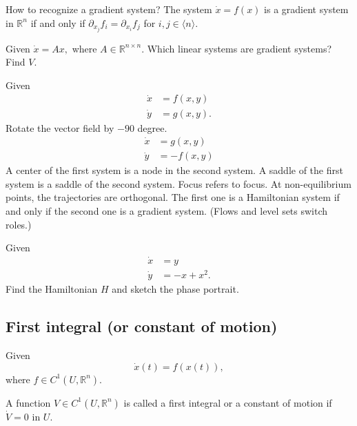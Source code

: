 \documentclass{article}
\newcommand*{\R}{\mathbb{R}}
\newcommand*{\Rn}{{\mathbb{R}^n}}
\newcommand*{\jbr}[1]{{\langle #1 \rangle}}
\begin{document}
How to recognize a gradient system?
The system $\dot x = f(x)$ is a gradient system in $\Rn$ if and only if $\partial_{x_j}f_i = \partial_{x_i}f_j$ for $i,j\in\jbr{n}$.

\begin{hw}
    Given $\dot x=Ax,$ where $ A\in\R^{n\times n}$. Which linear systems are gradient systems? Find $V$.
\end{hw}

\begin{thm}
    Given
    $$\begin{aligned}
        \dot x &= f(x,y)\\
        \dot y &= g(x,y).
    \end{aligned}$$
    Rotate the vector field by $-90$ degree.
    $$\begin{aligned}
        \dot x &= g(x,y)\\
        \dot y &= -f(x,y)
    \end{aligned}$$
    A center of the first system is a node in the second system. A saddle of the first system is a saddle of the second system. Focus refers to focus. At non-equilibrium points, the trajectories are orthogonal. The first one is a Hamiltonian system if and only if the second one is a gradient system. (Flows and level sets switch roles.)
\end{thm}

\begin{hw}
    Given
    $$\begin{aligned}
        \dot x &= y\\
        \dot y &= -x+x^2.
    \end{aligned}$$
    Find the Hamiltonian $H$ and sketch the phase portrait.
\end{hw}

\subsection{First integral (or constant of motion)}

Given
$$\dot x(t)=f(x(t)),$$
where $f \in C^1(U, \Rn)$.

\begin{defin}
    A function $V \in C^1(U,\Rn)$ is called a first integral or a constant of motion if $\dot V = 0$ in $U$.
\end{defin}
\end{document}
